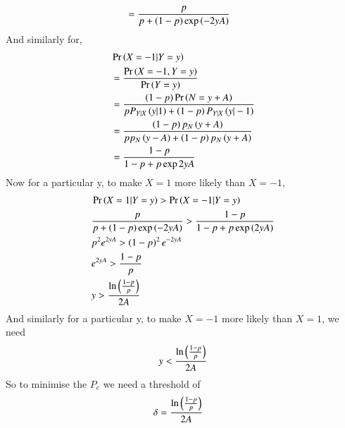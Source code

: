 \documentclass[journal,12pt,twocolumn]{IEEEtran}
\renewcommand\thesection{\arabic{section}}
\begin{document}
\begin{enumerate}[label=\thesection.\arabic*,ref=\thesection.\theenumi]
\begin{enumerate}[label=\thesection.\arabic*
,ref=\thesection.\theenumi]
\begin{align}
		      &= \frac{p}{p + \left(1-p\right)\exp\left(-2yA\right)}
       \end{align}
       And similarly for,
       \begin{align}
	          &\Pr\left(X=-1|Y=y\right) \\
	          &= \frac{\Pr\left(X=-1,Y=y\right)}{\Pr\left(Y=y\right)}\\
		      &= \frac{\left(1-p\right)\Pr\left(N = y +A\right)}{pP_{Y|X}\left(y|1\right) +\left(1-p\right)P_{Y|X}\left(y|-1\right)}\\
		      &= \frac{\left(1-p\right)p_{N}\left(y+A\right)}{pp_{N}\left(y-A\right) + \left(1-p\right)p_{N}\left(y+A\right)}\\
              &= \frac{1-p}{1-p+ p\exp{2yA}}
       \end{align}
       Now for a particular y, to make $X = 1$ more likely than $X= -1$,
        \begin{align}
	   &\Pr\left(X=1|Y=y\right) > \Pr\left(X=-1|Y=y\right)\\
	   &\frac{p}{p + \left(1-p\right)\exp\left(-2yA\right)} >\frac{1-p}{1-p+ p\exp\left(2yA\right)}\\
	   &p^2e^{2yA} > \left(1-p\right)^{2}e^{-2yA}\\
       &e^{2yA} >\frac{1-p}{p}\\
	   &y > \frac{\ln{\ensuremath{\left(\frac{1-p}{p}\right)}}}{2A}
	\end{align}
	And similarly for a particular y, to make $X=-1$ more likely than $X=1$, we need
	 \begin{align}
		 y < \frac{\ln{\ensuremath{\left(\frac{1-p}{p}\right)}}}{2A}
         \end{align}
	 So to minimise the $P_e$ we need a threshold of
	  \begin{align}
		  \delta &= \frac{\ln{\ensuremath{\left(\frac{1-p}{p}\right)}}}{2A}
          \end{align}		   
  \end{enumerate}

\end{enumerate}
\end{document}
